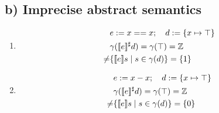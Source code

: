 \documentclass[11pt,a4paper]{scrartcl}
\begin{document}
\subsection*{b) Imprecise abstract semantics}
\begin{enumerate}
\item \begin{align*}
&e := x==x; \hspace*{1em} d := \{x \mapsto \top\} \\
&\gamma([\![e]\!]^\sharp d) = \gamma(\top) = \mathbb{Z} \\
\neq &\{[\![e]\!] s \; | \; s \in \gamma(d)\} = \{1\}
\end{align*}

\item \begin{align*}
&e := x-x; \hspace*{1em} d := \{x \mapsto \top\} \\
&\gamma([\![e]\!]^\sharp d) = \gamma(\top) = \mathbb{Z} \\
\neq &\{[\![e]\!] s \; | \; s \in \gamma(d)\} = \{0\}
\end{align*}
\end{enumerate}
\end{document}
